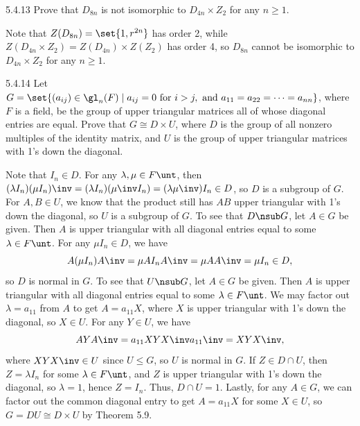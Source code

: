\begin{exercise}{5.4.13}
    Prove that $D_{8n}$ is not isomorphic to $D_{4n} \times Z_2$ for any $n \geq 1$.
\end{exercise}

\begin{sol}
    Note that $Z(D_{8n}) = \set{1, r^{2n}}$ has order 2, while $Z(D_{4n} \times Z_2) = Z(D_{4n}) \times Z(Z_2)$ has order 4, so $D_{8n}$ cannot be isomorphic to $D_{4n} \times Z_2$ for any $n \geq 1$.
\end{sol}

\begin{exercise}{5.4.14}
    Let $G = \set{(a_{ij}) \in \gl_n(F) \mid a_{ij} = 0 \text{ for } i > j, \text{ and } a_{11} = a_{22} = \cdots = a_{nn}}$, where $F$ is a field, be the group of upper triangular matrices all of whose diagonal entries are equal.
	Prove that $G \cong D \times U$, where $D$ is the group of all nonzero multiples of the identity matrix, and $U$ is the group of upper triangular matrices with 1's down the diagonal.
\end{exercise}

\begin{sol}
    Note that $I_n \in D$.
	For any $\lambda, \mu \in F\unt$, then $(\lambda I_n)(\mu I_n)\inv = (\lambda I_n)(\mu\inv I_n) = (\lambda\mu\inv)I_n \in D$, so $D$ is a subgroup of $G$.
	For $A, B \in U$, we know that the product still has $AB$ upper triangular with 1's down the diagonal, so $U$ is a subgroup of $G$.
	To see that $D \nsub G$, let $A \in G$ be given.
	Then $A$ is upper triangular with all diagonal entries equal to some $\lambda \in F\unt$.
	For any $\mu I_n \in D$, we have
    \[
    	A(\mu I_n)A\inv = \mu AI_n A\inv = \mu A A\inv = \mu I_n \in D,
    \]
    so $D$ is normal in $G$.
	To see that $U \nsub G$, let $A \in G$ be given.
	Then $A$ is upper triangular with all diagonal entries equal to some $\lambda \in F\unt$.
	We may factor out $\lambda = a_{11}$ from $A$ to get $A = a_{11} X$, where $X$ is upper triangular with 1's down the diagonal, so $X \in U$.
	For any $Y \in U$, we have
    \[
    	A Y A\inv = a_{11} X Y X\inv a_{11}\inv = X Y X\inv,
    \]
    where $XYX \inv \in U$ since $U \leq G$, so $U$ is normal in $G$.
	If $Z \in D \cap U$, then $Z = \lambda I_n$ for some $\lambda \in F\unt$, and $Z$ is upper triangular with 1's down the diagonal, so $\lambda = 1$, hence $Z = I_n$.
	Thus, $D \cap U = 1$.
	Lastly, for any $A \in G$, we can factor out the common diagonal entry to get $A = a_{11} X$ for some $X \in U$, so $G = DU \cong D \times U$ by Theorem 5.9.
\end{sol}

